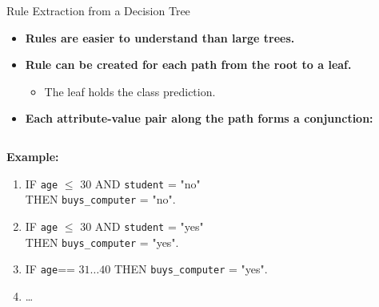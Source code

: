 \begin{frame}{Rule Extraction from a Decision Tree}
	\begin{itemize}
		\item \textbf{Rules are {\color{airforceblue}easier to understand} than large trees.}
		\item \textbf{Rule can be created for {\color{airforceblue}each path from the root to a leaf.}}
		      \begin{itemize}
			      \item The leaf holds the class prediction.
		      \end{itemize}
		\item \textbf{Each attribute-value pair along the path forms a conjunction:}
	\end{itemize}
	\vspace*{1em}
	\begin{columns}
		\begin{column}{0.7\textwidth}
			\textbf{Example:}
			\begin{enumerate}
				\item IF \texttt{age} $\leq$ 30 AND \texttt{student} = "no" \\
				      THEN \texttt{buys\_computer} = "no".
				\item IF \texttt{age} $\leq$ 30 AND \texttt{student} = "yes" \\
				      THEN \texttt{buys\_computer} = "yes".
				\item IF \texttt{age}== $31\ldots40$ THEN \texttt{buys\_computer} = "yes".
				\item \dots
			\end{enumerate}
		\end{column}
		\begin{column}{0.3\textwidth}
			\begin{figure*}[h]
				\centering
				
			\end{figure*}
		\end{column}
	\end{columns}
\end{frame}

